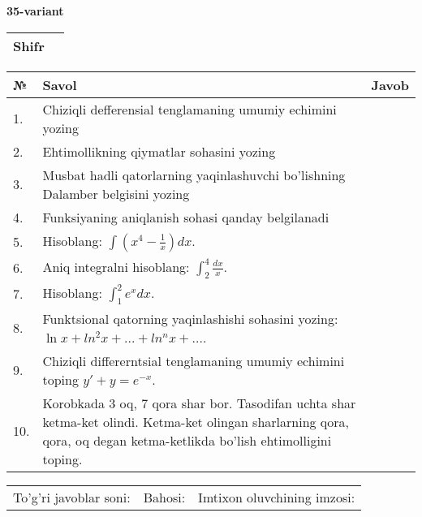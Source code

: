 \documentclass{article}
\begin{document}
  \egroup
  
  \newpage
  
  
  \textbf{35-variant}\\
  
  \bgroup
  \def\arraystretch{1.6} %
  
  \begin{tabular}{|m{5.7cm}|m{9.5cm}|}
  \hline
  Shifr & \\
  \hline
  \end{tabular}
  
  \vspace{1cm}
  
  \begin{tabular}{|m{0.7cm}|m{10cm}|m{4cm}|}
  \hline
  № & Savol & Javob \\
  \hline
  1. & Chiziqli defferensial tenglamaning umumiy echimini yozing &  \\
  \hline
  2. & Ehtimollikning qiymatlar sohasini yozing &  \\
  \hline
  3. & Musbat hadli qatorlarning yaqinlashuvchi bo'lishning Dalamber belgisini yozing &  \\
  \hline
  4. & Funksiyaning aniqlanish sohasi qanday belgilanadi &  \\
  \hline
  5. & Hisoblang: \(\int \left( x^{4} - \frac{1}{x} \right)dx\). &  \\
  \hline
  6. & Aniq integralni hisoblang: \(\int_{2}^{4}\frac{dx}{x}\). &  \\
  \hline
  7. & Hisoblang: \(\int_{1}^{2}{e^{x}dx}\). &  \\
  \hline
  8. & Funktsional qatorning yaqinlashishi sohasini yozing: \(\ln x + ln^{2}x + ... + ln^{n}x + ...\). &  \\
  \hline
  9. & Chiziqli differerntsial tenglamaning umumiy echimini toping \(y' + y = e^{- x}\). &  \\
  \hline
  10. & Korobkada 3 oq, 7 qora shar bor. Tasodifan uchta shar ketma-ket olindi. Ketma-ket olingan sharlarning qora, qora, oq degan ketma-ketlikda bo'lish ehtimolligini toping. &  \\
  \hline
  \end{tabular}
  
  \vspace{1cm}
  
  \begin{tabular}{lll}
  To'g'ri javoblar soni: \underline{\hspace{1.5cm}} & 
  Bahosi: \underline{\hspace{1.5cm}} & 
  Imtixon oluvchining imzosi: \underline{\hspace{2cm}} \\
  \end{tabular}
  
\end{document}
